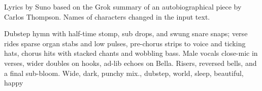 

\begin{notes}
Lyrics by Suno based on the Grok summary of an autobiographical piece by Carlos Thompson. %
Names of characters changed in the input text.
\end{notes}

\begin{style}
Dubstep hymn with half-time stomp, sub drops, and swung snare snaps; verse rides sparse organ stabs and low pulses, pre-chorus strips to voice and ticking hats, chorus hits with stacked chants and wobbling bass. %
Male vocals close-mic in verses, wider doubles on hooks, ad-lib echoes on Bella. %
Risers, reversed bells, and a final sub-bloom. %
Wide, dark, punchy mix., dubstep, world, sleep, beautiful, happy
\end{style}

